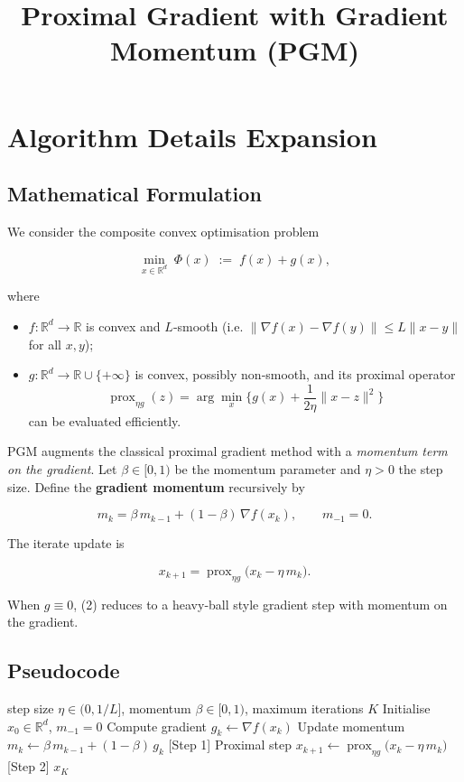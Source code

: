\documentclass{article}
\newcommand{\prox}{\operatorname{prox}}
\begin{document}
\title{Proximal Gradient with Gradient Momentum (PGM)}
\author{}
\date{}
\maketitle

\section*{Algorithm Details Expansion}

\subsection*{Mathematical Formulation}
We consider the composite convex optimisation problem  

\[
\min_{x\in\mathbb{R}^d}\; \Phi(x)\;:=\;f(x)+g(x),
\]

where  

\begin{itemize}
  \item $f:\mathbb{R}^d\rightarrow\mathbb{R}$ is convex and $L$‑smooth (i.e. $\|\nabla f(x)-\nabla f(y)\|\le L\|x-y\|$ for all $x,y$);
  \item $g:\mathbb{R}^d\rightarrow\mathbb{R}\cup\{+\infty\}$ is convex, possibly non‑smooth, and its proximal operator  
  \[
  \prox_{\eta g}(z)=\arg\min_{x}\Big\{ g(x)+\frac{1}{2\eta}\|x-z\|^{2}\Big\}
  \]
  can be evaluated efficiently.
\end{itemize}

PGM augments the classical proximal gradient method with a \emph{momentum term on the gradient}.  
Let $\beta\in[0,1)$ be the momentum parameter and $\eta>0$ the step size.  
Define the \textbf{gradient momentum} recursively by  

\[
m_{k}= \beta\, m_{k-1}+ (1-\beta)\,\nabla f(x_{k}),\qquad m_{-1}=0 .
\tag{1}
\]

The iterate update is  

\[
x_{k+1}= \prox_{\eta g}\!\bigl(x_{k}-\eta\, m_{k}\bigr).
\tag{2}
\]

When $g\equiv0$, (2) reduces to a heavy‑ball style gradient step with momentum on the gradient.  

\subsection*{Pseudocode}
\begin{algorithm}[H]
\caption{Proximal Gradient with Gradient Momentum (PGM)}
\begin{algorithmic}[1]
\Require step size $\eta\in(0,1/L]$, momentum $\beta\in[0,1)$, maximum iterations $K$
\State Initialise $x_{0}\in\mathbb{R}^{d}$, $m_{-1}=0$
    \State Compute gradient $g_{k}\gets\nabla f(x_{k})$
    \State Update momentum \; $m_{k}\gets \beta\, m_{k-1}+(1-\beta)\,g_{k}$ \hfill[Step 1]
    \State Proximal step \; $x_{k+1}\gets \prox_{\eta g}\!\bigl(x_{k}-\eta\, m_{k}\bigr)$ \hfill[Step 2]
\EndFor
\State \Return $x_{K}$
\end{algorithmic}
\end{algorithm}
\end{document}
